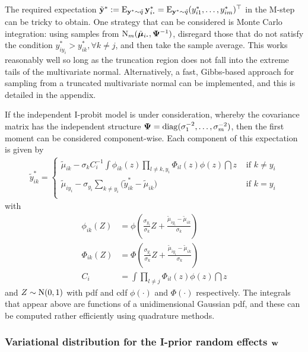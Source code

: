 The required expectation $\tilde\by^* := \E_{\by^*\sim\tilde q}\by^*_{i\bigcdot} = \E_{\by^*\sim\tilde q} (y_{i1}^*,\dots, y_{im}^*)^\top$ in the M-step can be tricky to obtain.
One strategy that can be considered is Monte Carlo integration: using samples from $\N_m(\tilde\bmu_{i \bigcdot},  \bPsi^{-1})$, disregard those that do not satisfy the condition $y_{iy_i}^* > y_{ik}^*, \forall k \neq j$, and then take the sample average.
This works reasonably well so long as the truncation region does not fall into the extreme tails of the multivariate normal.
Alternatively, a fast, Gibbs-based approach \citep{robert1995simulation} for sampling from a truncated multivariate normal can be implemented, and this is detailed in the appendix.

If the independent I-probit model is under consideration, whereby the covariance matrix has the independent structure ${\bm\Psi} = \operatorname{diag}(\sigma_1^{-2},\dots,\sigma_m^{-2})$, then the first moment  can be considered component-wise. 
Each component of this expectation is given by
\begin{align}\label{eq:ystarupdate}
  \tilde y_{ik}^* =
  \begin{cases}
    \tilde\mu_{ik} - \sigma_k C_i^{-1} \displaystyle{  \int \phi_{ik}(z) \prod_{l \neq k,y_i} \Phi_{il}(z) \phi(z) \dint z }
    &\text{ if } k \neq y_i \\[1.5em]
    \tilde\mu_{iy_i} - \sigma_{y_i} \sum_{k \neq y_i} \big(\tilde y_{ik}^* -  \tilde\mu_{ik} \big) 
    &\text{ if } k = y_i \\
  \end{cases}
\end{align}
with 
\begin{align*}
  \phi_{ik}(Z) &= \phi \left(\frac{\sigma_{y_i}}{\sigma_k} Z + \frac{\tilde\mu_{iy_i} - \tilde\mu_{ik}}{\sigma_k} \right) \\
  \Phi_{ik}(Z) &= \Phi \left(\frac{\sigma_{y_i}}{\sigma_k} Z + \frac{\tilde\mu_{iy_i} - \tilde\mu_{ik}}{\sigma_k} \right) \\
  C_i &= \int \prod_{l \neq j} \Phi_{il}(z) \phi(z) \dint z
\end{align*}
and $Z \sim \operatorname{N}(0,1)$ with pdf and cdf $\phi(\cdot)$ and $\Phi(\cdot)$ respectively. 
The integrals that appear above are functions of a unidimensional Gaussian pdf, and these can be computed rather efficiently using quadrature methods.

\subsubsection{Variational distribution for the I-prior random effects \texorpdfstring{${\mathbf w}$}{$w$}}

